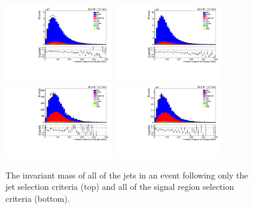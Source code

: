 \begin{figure}[ht]
\centering
\includegraphics[width=0.42\textwidth]{figs/background-estimation/plots/unblinded/prompt_ee_ttbarInc/totalJetMass_NPL_ee_jetSel_ee.pdf}
\includegraphics[width=0.42\textwidth]{figs/background-estimation/plots/unblinded/prompt_mumu_ttbarInc/totalJetMass_NPL_mumu_jetSel_mumu.pdf}
\\
\includegraphics[width=0.42\textwidth]{figs/background-estimation/plots/unblinded/prompt_ee_ttbarInc/totalJetMass_NPL_ee_wMass_ee.pdf}
\includegraphics[width=0.42\textwidth]{figs/background-estimation/plots/unblinded/prompt_mumu_ttbarInc/totalJetMass_NPL_mumu_wMass_mumu.pdf}
\caption{
The invariant mass of all of the jets in an event following only the jet selection criteria (top) and all of the signal region selection criteria (bottom).
}
\label{fig:SR_totalJetMass}
\end{figure}

